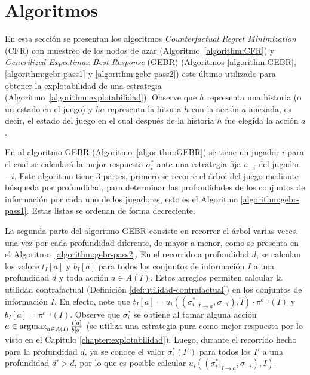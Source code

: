 \chapter{Algoritmos}
\label{apex:chapter:algoritmos}
\algnewcommand{\OR}{\algorithmicor}
\algnewcommand{\AND}{\algorithmicand}

En esta sección se presentan los algoritmos \textit{Counterfactual Regret Minimization} (CFR) con muestreo de los nodos de azar (Algoritmo~\ref{algorithm:CFR}) y \textit{Generilized Expectimax Best Response} (GEBR) (Algoritmos \ref{algorithm:GEBR}, \ref{algorithm:gebr-pass1} y \ref{algorithm:gebr-pass2}) este último utilizado para obtener la explotabilidad de una estrategia (Algoritmo~\ref{algorithm:explotabilidad}). Observe que $h$ representa una historia (o un estado en el juego) y $ha$ representa la hitoria $h$ con la acción $a$ anexada, es decir, el estado del juego en el cual después de la historia $h$ fue elegida la acción $a$.

En al algoritmo GEBR (Algoritmo~\ref{algorithm:GEBR}) se tiene un jugador $i$ para el cual se calculará la mejor respuesta $\sigma^*_i$ ante una estrategia fija $\sigma_{-i}$ del jugador $-i$. Este algoritmo tiene $3$ partes, primero se recorre el árbol del juego mediante búsqueda por profundidad, para determinar las profundidades de los conjuntos de información por cada uno de los jugadores, esto es el Algoritmo \ref{algorithm:gebr-pass1}. Estas listas se ordenan de forma decreciente.

La segunda parte del algoritmo GEBR consiste en recorrer el árbol varias veces, una vez por cada profundidad diferente, de mayor a menor, como se presenta en el Algoritmo~\ref{algorithm:gebr-pass2}. En el recorrido a profundidad $d$, se calculan los valore $t_I[a]$ y $b_I[a]$ para todos los conjuntos de información $I$ a una profundidad $d$ y toda acción $a \in A(I)$. Estos arreglos permiten calcular la utilidad contrafactual (Definición \ref{def:utilidad-contrafactual}) en los conjuntos de información $I$. En efecto, note que $t_I[a] = u_i((\sigma^*_i|_{I \rightarrow a}, \sigma_{-i}),I) \cdot \pi^{\sigma_{-i}}(I)$ y $b_I[a] = \pi^{\sigma_{-i}}(I)$. Observe que $\sigma^*_i$ se obtiene al tomar alguna acción $a \in  \operatorname*{\arg\!\max}_{a \in A(I)} \frac{t[a]}{b[a]}$ (se utiliza una estrategia pura como mejor respuesta por lo visto en el Capítulo \ref{chapter:explotabilidad}). Luego, durante el recorrido hecho para la profundidad $d$, ya se conoce el valor $\sigma^*_i(I')$ para todos los $I'$ a una profundidad $d' > d$, por lo que es posible calcular  $u_i((\sigma^*_i|_{I \rightarrow a}, \sigma_{-i}),I)$.

